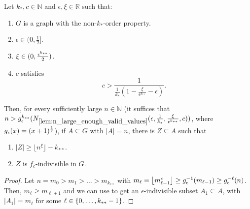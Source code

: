         \begin{lemma} \label{lem:many_values_to_equitative_partition_with_bound_exceptional_pairs}
            Let $k_*, c \in \mathbb{N}$ and $\epsilon, \xi \in \mathbb{R}$ such that:
            \begin{enumerate}[label={\Roman*}., ref={\Roman*}, font=\rmfamily]
                \item\label{itm:many_values_to_equitative_partition_with_bound_exceptional_pairs.1} $G$ is a graph with the non-$k_*$-order property.
                \item\label{itm:many_values_to_equitative_partition_with_bound_exceptional_pairs.2} $\epsilon \in (0, \frac{1}{2}]$.
                \item\label{itm:many_values_to_equitative_partition_with_bound_exceptional_pairs.3} $\xi \in ( 0, \frac{\epsilon^{k_{**}}}{2} )$.
                \item\label{itm:many_values_to_equitative_partition_with_bound_exceptional_pairs.4} $c$ satisfies \[
                    c > \frac{1}{\frac{1}{k_*} (1 - \frac{\xi}{\epsilon^{k_{**}}} - \epsilon)}.
                \]
            \end{enumerate}
            Then, for every sufficiently large $n \in \mathbb{N}$ (it suffices that $n >
            g_\epsilon^{k_{**}}( N_{\ref{lem:n_large_enough_valid_values}}( \epsilon, \frac{1}{k_*}, \frac{\xi}{\epsilon^{k_{**}}}, c ) )$,
            where $g_\epsilon(x) = ( x+1 )^{\frac{1}{\epsilon}}$),
            if $A \subseteq G$ with $|A| = n$, there is $Z \subseteq A$ such that
            \begin{enumerate}[label=\roman*., ref=\roman*, font=\rmfamily]
                \item\label{itm:many_values_to_equitative_partition_with_bound_exceptional_pairs.a} $|Z| \geq \lfloor n^\xi \rfloor - k_{**}$.
                \item\label{itm:many_values_to_equitative_partition_with_bound_exceptional_pairs.b} $Z$ is $f_c$-indivisible in $G$.
            \end{enumerate}
            \begin{proof}
                Let $n = m_0 > m_1 > \dots > m_{k_{**}}$ with $m_\ell = \left\lfloor m_{\ell-1}^\epsilon \right\rfloor \geq g_\epsilon^{-1}(m_{\ell-1}) \geq g_\epsilon^{-\ell}(n)$.
                Then, $m_\ell \geq m_{\ell+1}$ and we can use 
                to get an $\epsilon$-indivisible subset $A_1 \subseteq A$, with $|A_1| = m_\ell$ for some $\ell \in \{ 0, \dots, k_{**}-1 \}$.

\end{proof}
\end{lemma}
